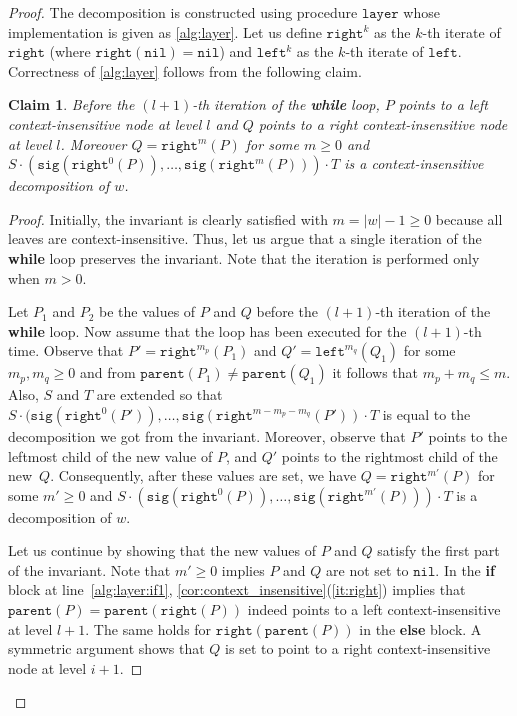 \documentclass[a4paper]{article}
\newtheorem{claim}[theorem]{Claim}
\theoremstyle{remark}
\newcommand{\layerop}{\mathtt{layer}}
\newcommand{\itparent}{\mathtt{parent}}
\newcommand{\itleft}{\mathtt{left}}
\newcommand{\itright}{\mathtt{right}}
\newcommand{\itnil}{\mathtt{nil}}
\newcommand{\itsig}{\mathtt{sig}}
\begin{document}
\begin{proof}
The decomposition is constructed using procedure $\layerop$ whose implementation is given as \cref{alg:layer}.
Let us define $\itright^k$ as the $k$-th iterate of $\itright$ (where $\itright(\itnil)=\itnil$)
and $\itleft^k$ as the $k$-th iterate of $\itleft$.
Correctness of \cref{alg:layer} follows from the following claim.

\begin{claim}
Before the $(l+1)$-th iteration of the \textbf{while} loop,
$P$ points to a left context-insensitive node at level $l$ and $Q$ points to a right context-insensitive node at level $l$.
Moreover $Q=\itright^m(P)$ for some $m\geq0$ and $S \cdot (\itsig(\itright^0(P)),\ldots,\itsig(\itright^m(P))) \cdot T$
is a context-insensitive decomposition of $w$.
\end{claim}
\begin{proof}
Initially, the invariant is clearly satisfied with $m=|w|-1\geq0$ because all leaves are context-insensitive.
Thus, let us argue that a single iteration of the \textbf{while} loop preserves the invariant.
Note that the iteration is performed only when $m > 0$.

Let $P_1$ and $P_2$ be the values of $P$ and $Q$ before the $(l+1)$-th iteration
of the \textbf{while} loop.
Now assume that the loop has been executed for the $(l+1)$-th time.
Observe that $P'=\itright^{m_p}(P_1)$ and $Q'=\itleft^{m_q}(Q_1)$ for some $m_p,m_q\geq0$
and from $\itparent(P_1)\neq\itparent(Q_1)$ it follows that $m_p+m_q\leq m$.
Also, $S$ and $T$ are extended so that
$S \cdot (\itsig(\itright^0(P')),\ldots,\itsig(\itright^{m-m_p-m_q}(P')) \cdot T$ is equal to the decomposition
we got from the invariant. Moreover, observe that $P'$ points to the leftmost child of the new value of $P$,
and $Q'$ points to the rightmost child of the new~$Q$. Consequently, after these values are set, we have $Q=\itright^{m'}(P)$ for some $m'\ge 0$
and $S \cdot (\itsig(\itright^0(P)),\ldots,\itsig(\itright^{m'}(P))) \cdot T$ is a decomposition of $w$.

Let us continue by showing that the new values of $P$ and $Q$ satisfy the first part of the invariant.
Note that $m'\ge 0$ implies $P$ and $Q$ are not set to $\itnil$.
In the \textbf{if} block at line~\ref{alg:layer:if1}, \cref{cor:context_insensitive}(\ref{it:right}) implies
that $\itparent(P)=\itparent(\itright(P))$ indeed points to a left context-insensitive at level $l+1$.
The same holds for $\itright(\itparent(P))$ in the \textbf{else} block.
A symmetric argument shows that $Q$ is set to point to a right context-insensitive node at level $i+1$.


\end{proof}
\end{proof}
\end{document}
